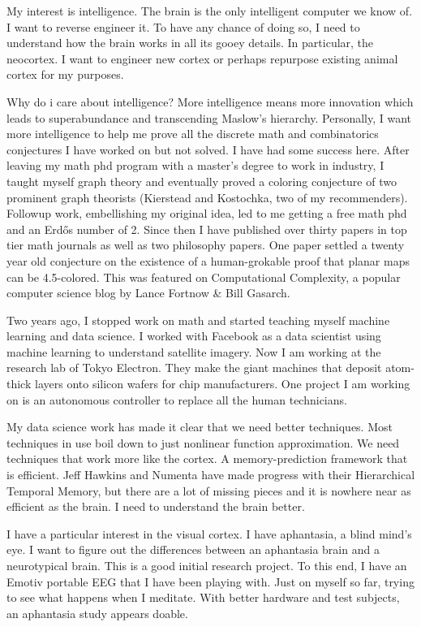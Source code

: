 \documentclass{article}
\title{}
\author{Landon Rabern}
\begin{document}
\maketitle
My interest is intelligence. The brain is the only intelligent computer we know of. I want to reverse engineer it. To have any chance of doing so, I need to understand how the brain works in all its gooey details. In particular, the neocortex. I want to engineer new cortex or perhaps repurpose existing animal cortex for my purposes. 

Why do i care about intelligence? More intelligence means more innovation which leads to superabundance and transcending Maslow's hierarchy. Personally, I want more intelligence to help me prove all the discrete math and combinatorics conjectures I have worked on but not solved. I have had some success here. After leaving my math phd program with a master's degree to work in industry, I taught myself graph theory and eventually proved a coloring conjecture of two prominent graph theorists (Kierstead and Kostochka, two of my recommenders). Followup work, embellishing my original idea, led to me getting a free math phd and an Erdős number of 2.  Since then I have published over thirty papers in top tier math journals as well as two philosophy papers. One paper settled a twenty year old conjecture on the existence of a human-grokable proof that planar maps can be 4.5-colored. This was featured on Computational Complexity, a popular computer science blog by Lance Fortnow \& Bill Gasarch.

Two years ago, I stopped work on math and started teaching myself machine learning and data science. I worked with Facebook as a data scientist using machine learning to understand satellite imagery. Now I am working at the research lab of Tokyo Electron. They make the giant machines that deposit atom-thick layers onto silicon wafers for chip manufacturers. One project I am working on is an autonomous controller to replace all the human technicians. 

My data science work has made it clear that we need better techniques. Most techniques in use boil down to just nonlinear function approximation. We need techniques that work more like the cortex. A memory-prediction framework that is efficient. Jeff Hawkins and Numenta have made progress with their Hierarchical Temporal Memory, but there are a lot of missing pieces and it is nowhere near as efficient as the brain. I need to understand the brain better. 

I have a particular interest in the visual cortex. I have aphantasia, a blind mind's eye. I want to figure out the differences between an aphantasia brain and a neurotypical brain. This is a good initial research project. To this end, I have an Emotiv portable EEG that I have been playing with. Just on myself so far, trying to see what happens when I meditate. With better hardware and test subjects, an aphantasia study appears doable.
\end{document}
